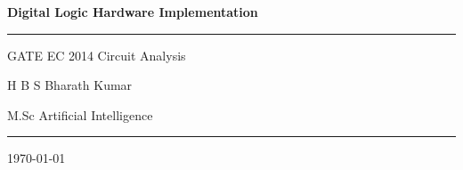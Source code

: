\documentclass[12pt,a4paper]{article}
\begin{document}
\begin{titlepage}
\centering

\vspace*{2.5cm}

{\Huge\bfseries Digital Logic Hardware Implementation}

\vspace{0.4cm}

\rule{0.55\textwidth}{0.8pt}

\vspace{0.4cm}

{\Large GATE EC 2014 Circuit Analysis}

\vspace{2cm}

{\Large H B S Bharath Kumar}

\vspace{0.3cm}

{\large M.Sc Artificial Intelligence}

\vfill

\rule{0.35\textwidth}{0.5pt}

\vspace{0.3cm}

{\large \today}

\end{titlepage}
\end{document}
